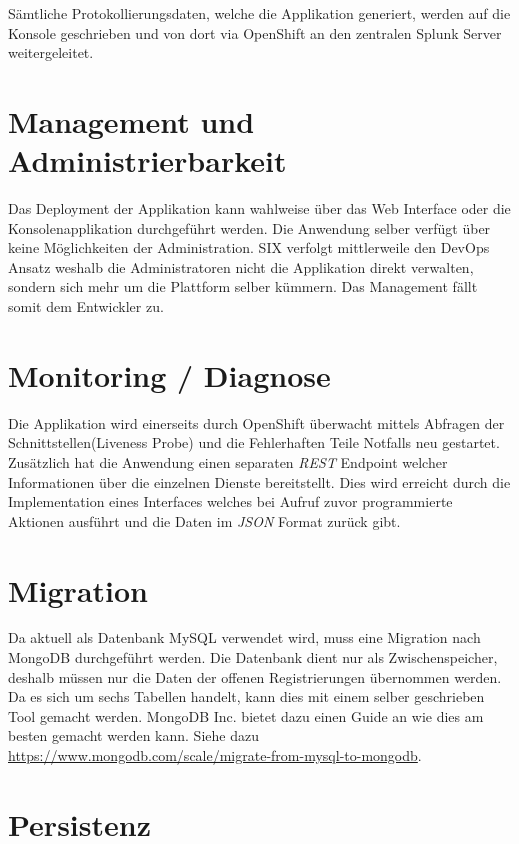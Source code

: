 Sämtliche Protokollierungsdaten, welche die Applikation generiert, werden auf die Konsole geschrieben und von dort via OpenShift an den zentralen Splunk Server weitergeleitet.

\section{Management und Administrierbarkeit}

Das Deployment der Applikation kann wahlweise über das Web Interface oder die Konsolenapplikation durchgeführt werden. Die Anwendung selber verfügt über keine Möglichkeiten der Administration. SIX verfolgt mittlerweile den DevOps Ansatz weshalb die Administratoren nicht die Applikation direkt verwalten, sondern sich mehr um die Plattform selber kümmern. Das Management fällt somit dem Entwickler zu. 

\section{Monitoring / Diagnose}

Die Applikation wird einerseits durch OpenShift überwacht mittels Abfragen der Schnittstellen(Liveness Probe) und die Fehlerhaften Teile Notfalls neu gestartet. Zusätzlich hat die Anwendung einen separaten \textit{\gls{REST}} Endpoint welcher Informationen über die einzelnen Dienste bereitstellt. Dies wird erreicht durch die Implementation eines Interfaces welches bei Aufruf zuvor programmierte Aktionen ausführt und die Daten im \textit{\gls{JSON}} Format zurück gibt.

\section{Migration}

Da aktuell als Datenbank MySQL verwendet wird, muss eine Migration nach MongoDB durchgeführt werden. Die Datenbank dient nur als Zwischenspeicher, deshalb müssen nur die Daten der offenen Registrierungen übernommen werden. Da es sich um sechs Tabellen handelt, kann dies mit einem selber geschrieben Tool gemacht werden. MongoDB Inc. bietet dazu einen Guide an wie dies am besten gemacht werden kann. Siehe dazu \url{https://www.mongodb.com/scale/migrate-from-mysql-to-mongodb}.

\section{Persistenz}
\label{persistenz}

